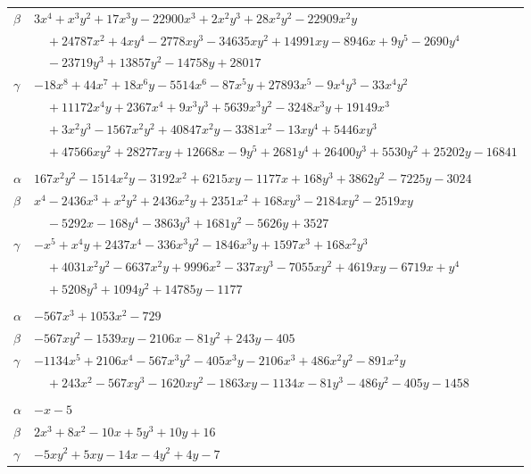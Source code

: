 \documentclass[11pt]{article}
\begin{document}
\begin{longtable}{@{}ll@{}}
$\beta$ & $3x^{4}+x^{3}y^{2}+17x^{3}y-22900x^{3}+2x^{2}y^{3}+28x^{2}y^{2}-22909x^{2}y$\\
 & $\quad +24787x^{2}+4xy^{4}-2778xy^{3}-34635xy^{2}+14991xy-8946x+9y^{5}-2690y^{4}$\\
 & $\quad -23719y^{3}+13857y^{2}-14758y+28017$\\
$\gamma$ & $-18x^{8}+44x^{7}+18x^{6}y-5514x^{6}-87x^{5}y+27893x^{5}-9x^{4}y^{3}-33x^{4}y^{2}$\\
 & $\quad +11172x^{4}y+2367x^{4}+9x^{3}y^{3}+5639x^{3}y^{2}-3248x^{3}y+19149x^{3}$\\
 & $\quad +3x^{2}y^{3}-1567x^{2}y^{2}+40847x^{2}y-3381x^{2}-13xy^{4}+5446xy^{3}$\\
 & $\quad +47566xy^{2}+28277xy+12668x-9y^{5}+2681y^{4}+26400y^{3}+5530y^{2}+25202y-16841$\\
\addlinespace[3pt]
\multicolumn{2}{@{}l}{$\{i,j\}=\{43,48\}$, $k_{ij}=2^{4}\cdot 3^{3}\cdot 7$}\\
$\alpha$ & $167x^{2}y^{2}-1514x^{2}y-3192x^{2}+6215xy-1177x+168y^{3}+3862y^{2}-7225y-3024$\\
$\beta$ & $x^{4}-2436x^{3}+x^{2}y^{2}+2436x^{2}y+2351x^{2}+168xy^{3}-2184xy^{2}-2519xy$\\
 & $\quad -5292x-168y^{4}-3863y^{3}+1681y^{2}-5626y+3527$\\
$\gamma$ & $-x^{5}+x^{4}y+2437x^{4}-336x^{3}y^{2}-1846x^{3}y+1597x^{3}+168x^{2}y^{3}$\\
 & $\quad +4031x^{2}y^{2}-6637x^{2}y+9996x^{2}-337xy^{3}-7055xy^{2}+4619xy-6719x+y^{4}$\\
 & $\quad +5208y^{3}+1094y^{2}+14785y-1177$\\
\addlinespace[3pt]
\multicolumn{2}{@{}l}{$\{i,j\}=\{43,91\}$, $k_{ij}=3^{6}$}\\
$\alpha$ & $-567x^{3}+1053x^{2}-729$\\
$\beta$ & $-567xy^{2}-1539xy-2106x-81y^{2}+243y-405$\\
$\gamma$ & $-1134x^{5}+2106x^{4}-567x^{3}y^{2}-405x^{3}y-2106x^{3}+486x^{2}y^{2}-891x^{2}y$\\
 & $\quad +243x^{2}-567xy^{3}-1620xy^{2}-1863xy-1134x-81y^{3}-486y^{2}-405y-1458$\\
\addlinespace[3pt]
\multicolumn{2}{@{}l}{$\{i,j\}=\{50,51\}$, $k_{ij}=3\cdot 7$}\\
$\alpha$ & $-x-5$\\
$\beta$ & $2x^{3}+8x^{2}-10x+5y^{3}+10y+16$\\
$\gamma$ & $-5xy^{2}+5xy-14x-4y^{2}+4y-7$\\

\end{longtable}
\end{document}
